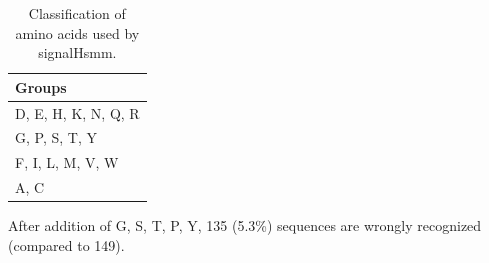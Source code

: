 \documentclass[10pt]{beamer}\usepackage[]{graphicx}\usepackage[]{color}
\begin{document}
\begin{frame}
\begin{table}[ht]
\centering
\begin{tabular}{l}
  \hline
Groups \\ 
  \hline
D, E, H, K, N, Q, R \\ 
  G, P, S, T, Y \\ 
  F, I, L, M, V, W \\ 
  A, C \\ 
   \hline
\end{tabular}
\caption{Classification of amino acids used by signalHsmm.} 
\end{table}

\end{frame}

\begin{frame}

After addition of G, S, T, P, Y, 135 (5.3\%) sequences are wrongly recognized (compared to 149).

\end{frame}
\end{document}
